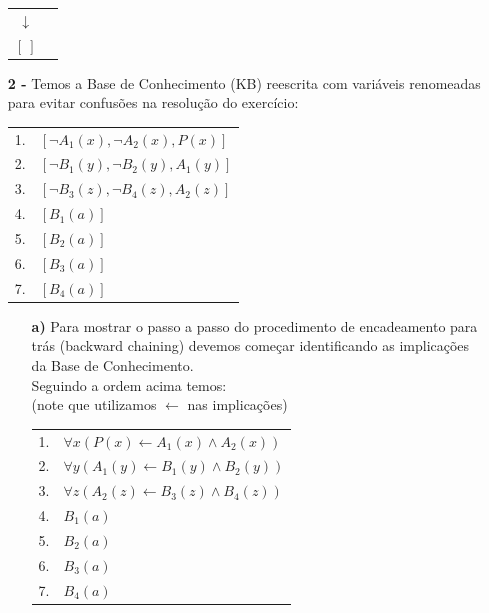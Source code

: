 \documentclass[12pt]{article}
\begin{document}
\begin{itemize}
\begin{center}
\begin{tabular}{c c}
					$\downarrow$ & \\
					$[ \ ]$ & \\
				\end{tabular}
			\end{center}
		\item[\textbf{2 -}]
			\hfill\newline
			Temos a Base de Conhecimento (KB) reescrita com variáveis renomeadas para evitar 
			confusões	na resolução do exercício:
			\begin{center}
				\begin{tabular}{c l}
				1. & $[\neg A_1(x), \neg A_2(x), P(x)]$\\
				2. & $[\neg B_1(y), \neg B_2(y), A_1(y)]$\\
				3. & $[\neg B_3(z), \neg B_4(z), A_2(z)]$\\
				4. & $[B_1(a)]$\\
				5. & $[B_2(a)]$\\
				6. & $[B_3(a)]$\\
				7. & $[B_4(a)]$\\
				\end{tabular}
			\end{center}
			\begin{itemize}	
				\item[\textbf{a) }]					
					\hfill\newline
					Para mostrar o passo a passo do procedimento de encadeamento para
					trás (backward chaining) devemos começar identificando as implicações
					da Base de Conhecimento.\\
					Seguindo a ordem acima temos:\\ 
					(note que utilizamos $\leftarrow$ nas implicações)\\
					\begin{center}
						\begin{tabular}{c l}
							1. & $\forall x (P(x) \leftarrow A_1(x) \land A_2(x))$\\
							2. & $\forall y (A_1(y) \leftarrow B_1(y) \land B_2(y))$\\
							3. & $\forall z (A_2(z) \leftarrow B_3(z) \land B_4(z))$\\
							4. & $B_1(a)$\\
							5. & $B_2(a)$\\
							6. & $B_3(a)$\\
							7. & $B_4(a)$\\
						\end{tabular}
					\end{center}

\end{itemize}
\end{itemize}
\end{document}
